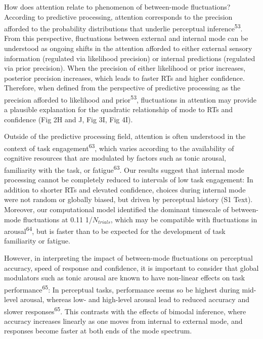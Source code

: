 \documentclass[
]{article}
\begin{document}
How does attention relate to phenomenon of between-mode fluctuations?
According to predictive processing, attention corresponds to the
precision afforded to the probability distributions that underlie
perceptual inference\textsuperscript{53}. From this perspective,
fluctuations between external and internal mode can be understood as
ongoing shifts in the attention afforded to either external sensory
information (regulated via likelihood precision) or internal predictions
(regulated via prior precision). When the precision of either likelihood
or prior increases, posterior precision increases, which leads to faster
RTs and higher confidence. Therefore, when defined from the perspective
of predictive processing as the precision afforded to likelihood and
prior\textsuperscript{53}, fluctuations in attention may provide a
plausible explanation for the quadratic relationship of mode to RTs and
confidence (Fig 2H and J, Fig 3I, Fig 4I).

Outside of the predictive processing field, attention is often
understood in the context of task engagement\textsuperscript{63}, which
varies according to the availability of cognitive resources that are
modulated by factors such as tonic arousal, familiarity with the task,
or fatigue\textsuperscript{63}. Our results suggest that internal mode
processing cannot be completely reduced to intervals of low task
engagement: In addition to shorter RTs and elevated confidence, choices
during internal mode were not random or globally biased, but driven by
perceptual history (S1 Text). Moreover, our computational
model identified the dominant timescale of between-mode fluctuations at
0.11 1/\(N_{trials}\), which may be compatible with fluctuations in
arousal\textsuperscript{64}, but is faster than to be expected for the
development of task familiarity or fatigue.

However, in interpreting the impact of between-mode fluctuations on
perceptual accuracy, speed of response and confidence, it is important
to consider that global modulators such as tonic arousal are known to
have non-linear effects on task performance\textsuperscript{65}: In
perceptual tasks, performance seems so be highest during mid-level
arousal, whereas low- and high-level arousal lead to reduced accuracy
and slower responses\textsuperscript{65}. This contrasts with the
effects of bimodal inference, where accuracy increases linearly as one
moves from internal to external mode, and responses become faster at
both ends of the mode spectrum.
\end{document}
